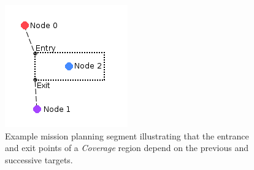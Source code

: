 \documentclass{tamuccthesis}
\begin{document}
\begin{figure}[H]
\includegraphics[]{segment_example.png}
\caption[Example mission planning segment.]{Example mission planning segment illustrating that the entrance and exit points of a \textit{Coverage} region depend on the previous and successive targets.}
\label{segment_example}
\end{figure}
\end{document}
